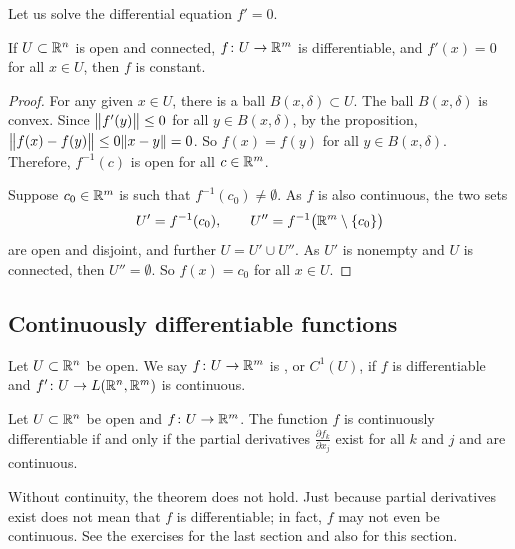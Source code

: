 Let us solve the differential equation $f' = 0$.

\begin{cor}
If $U \subset {\mathbb{R}}^n$ is open and connected, $f \colon U \to {\mathbb{R}}^m$ is
differentiable,
and $f'(x) = 0$ for all $x \in U$, then $f$ is constant.
\end{cor}

\begin{proof}
For any given $x \in U$, there is a ball $B(x,\delta) \subset U$.  The ball
$B(x,\delta)$ is convex.  Since
$\bigl\lVert {f'(y)} \bigr\rVert \leq 0$ for all $y \in B(x,\delta)$, by the proposition,
$\bigl\lVert {f(x)-f(y)} \bigr\rVert \leq 0 \lVert {x-y} \rVert = 0$.  So $f(x) = f(y)$ for all $y \in
B(x,\delta)$.
Therefore, $f^{-1}(c)$ is open for all $c \in {\mathbb{R}}^m$.

Suppose $c_0 \in {\mathbb{R}}^m$ is such that
$f^{-1}(c_0) \neq \emptyset$. 
As $f$ is also continuous,
the two sets
\begin{equation*}
U' = f^{-1}(c_0), \qquad U'' = f^{-1}\bigl({\mathbb{R}}^m\setminus\{c_0\}\bigr)
\end{equation*}
are open and disjoint, and further $U = U' \cup U''$.  As $U'$ is nonempty
and $U$ is connected, then
$U'' = \emptyset$.  So $f(x) = c_0$ for all $x \in U$.
\end{proof}

\subsection{Continuously differentiable functions}

\begin{defn}
Let $U \subset {\mathbb{R}}^n$ be open.
We say $f \colon U \to {\mathbb{R}}^m$ is
\emph{},
or $C^1(U)$,
if $f$ is differentiable and $f' \colon U \to L({\mathbb{R}}^n,{\mathbb{R}}^m)$
is continuous.
\end{defn}

\begin{prop} \label{mv:prop:contdiffpartials}
Let $U \subset {\mathbb{R}}^n$ be open and
$f \colon U \to {\mathbb{R}}^m$.  The function
$f$ is continuously differentiable if and only if 
the partial derivatives $\frac{\partial f_k}{\partial x_j}$
exist for all $k$ and $j$ and are continuous.
\end{prop}

Without continuity, the theorem does not hold.  Just because
partial derivatives exist does not mean that $f$ is differentiable;
in fact, $f$ may not even be continuous.  See the exercises
for the last section and also for this section.

